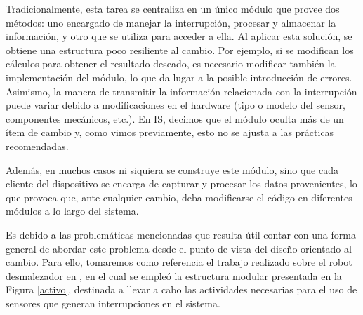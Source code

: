 Tradicionalmente, esta tarea se centraliza en un único módulo que provee dos métodos: uno encargado de manejar la interrupción, procesar y almacenar la información, y otro que se utiliza para acceder a ella. Al aplicar esta solución, se obtiene una estructura poco resiliente al cambio. Por ejemplo, si se modifican los cálculos para obtener el resultado deseado, es necesario modificar también la implementación del módulo, lo que da lugar a la posible introducción de errores. Asimismo, la manera de transmitir la información relacionada con la interrupción puede variar debido a modificaciones en el hardware (tipo o modelo del sensor, componentes mecánicos, etc.). En \gls{IS}, decimos que el módulo oculta más de un ítem de cambio y, como vimos previamente, esto no se ajusta a las prácticas recomendadas.

Además, en muchos casos ni siquiera se construye este módulo, sino que cada cliente del dispositivo se encarga de capturar y procesar los datos provenientes, lo que provoca que, ante cualquier cambio, deba modificarse el código en diferentes módulos a lo largo del sistema.

Es debido a las problemáticas mencionadas que resulta útil contar con una forma general de abordar este problema desde el punto de vista del diseño orientado al cambio. Para ello, tomaremos como referencia el trabajo realizado sobre el robot desmalezador en \cite{paperPomponio}, en el cual se empleó la estructura modular presentada en la Figura \ref{activo}, destinada a llevar a cabo las actividades necesarias para el uso de sensores que generan interrupciones en el sistema.

